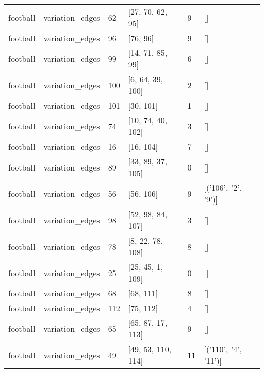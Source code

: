\begin{tabular}{llllll}
football & variation_edges & 62 & [27, 70, 62, 95] & 9 & [] \\
football & variation_edges & 96 & [76, 96] & 9 & [] \\
football & variation_edges & 99 & [14, 71, 85, 99] & 6 & [] \\
football & variation_edges & 100 & [6, 64, 39, 100] & 2 & [] \\
football & variation_edges & 101 & [30, 101] & 1 & [] \\
football & variation_edges & 74 & [10, 74, 40, 102] & 3 & [] \\
football & variation_edges & 16 & [16, 104] & 7 & [] \\
football & variation_edges & 89 & [33, 89, 37, 105] & 0 & [] \\
football & variation_edges & 56 & [56, 106] & 9 & [('106', '2', '9')] \\
football & variation_edges & 98 & [52, 98, 84, 107] & 3 & [] \\
football & variation_edges & 78 & [8, 22, 78, 108] & 8 & [] \\
football & variation_edges & 25 & [25, 45, 1, 109] & 0 & [] \\
football & variation_edges & 68 & [68, 111] & 8 & [] \\
football & variation_edges & 112 & [75, 112] & 4 & [] \\
football & variation_edges & 65 & [65, 87, 17, 113] & 9 & [] \\
football & variation_edges & 49 & [49, 53, 110, 114] & 11 & [('110', '4', '11')] \\
\bottomrule
\end{tabular}


